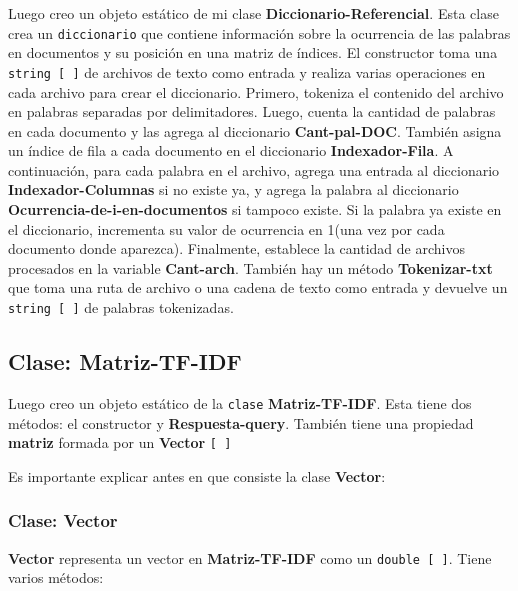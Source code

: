 \documentclass[a4paper,12pt]{article}
\begin{document}
Luego creo un objeto estático de mi clase \textbf{Diccionario-Referencial}. Esta clase crea un \texttt{diccionario} que contiene información sobre la ocurrencia de las palabras en documentos y su posición en una matriz de índices. El constructor toma una \texttt{string [ ]} de archivos de texto como entrada y realiza varias operaciones en cada archivo para crear el diccionario. Primero, tokeniza el contenido del archivo en palabras separadas por delimitadores. Luego, cuenta la cantidad de palabras en cada documento y las agrega al diccionario \textbf{Cant-pal-DOC}. También asigna un índice de fila a cada documento en el diccionario \textbf{Indexador-Fila}. A continuación, para cada palabra en el archivo, agrega una entrada al diccionario \textbf{Indexador-Columnas} si no existe ya, y agrega la palabra al diccionario \textbf{Ocurrencia-de-i-en-documentos} si tampoco existe. Si la palabra ya existe en el diccionario, incrementa su valor de ocurrencia en 1(una vez por cada documento donde aparezca). Finalmente, establece la cantidad de archivos procesados en la variable \textbf{Cant-arch}. También hay un método \textbf{Tokenizar-txt} que toma una ruta de archivo o una cadena de texto como entrada y devuelve un \texttt{string [ ]} de palabras tokenizadas.

\subsection{Clase: \textbf{Matriz-TF-IDF}}\label{subsec:matriz-TF-IDF}

Luego creo un objeto estático  de la \texttt{clase} \textbf{Matriz-TF-IDF}.  Esta tiene dos métodos: el constructor y \textbf{Respuesta-query}. También
tiene una propiedad \textbf{matriz} formada por un \textbf{Vector} \texttt{[ ]}

Es importante explicar antes en que consiste la clase  \textbf{Vector}:

\subsubsection{Clase: Vector}\label{subsubsec:Vector}

\textbf{Vector} representa un vector en \textbf{Matriz-TF-IDF} como un \texttt{double [ ]}. Tiene varios métodos:
\end{document}
